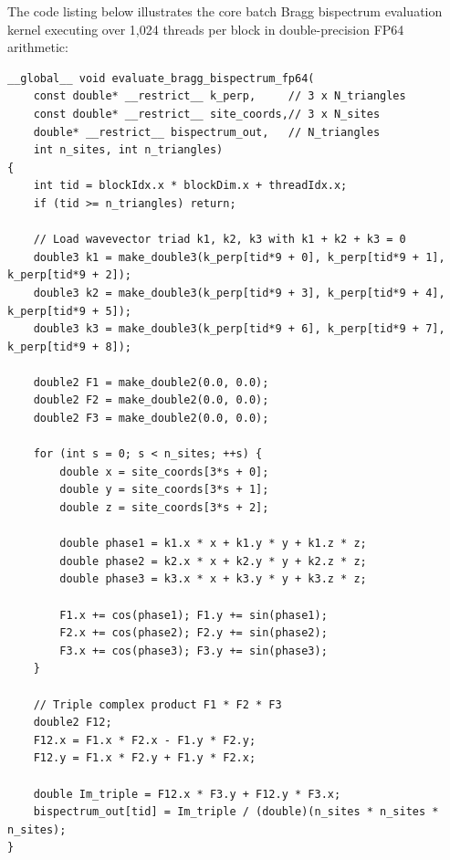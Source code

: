 \documentclass[11pt,a4paper]{article}
\theoremstyle{definition}
\begin{document}
The code listing below illustrates the core batch Bragg bispectrum evaluation kernel executing over 1,024 threads per block in double-precision FP64 arithmetic:

\begin{verbatim}
__global__ void evaluate_bragg_bispectrum_fp64(
    const double* __restrict__ k_perp,     // 3 x N_triangles
    const double* __restrict__ site_coords,// 3 x N_sites
    double* __restrict__ bispectrum_out,   // N_triangles
    int n_sites, int n_triangles) 
{
    int tid = blockIdx.x * blockDim.x + threadIdx.x;
    if (tid >= n_triangles) return;

    // Load wavevector triad k1, k2, k3 with k1 + k2 + k3 = 0
    double3 k1 = make_double3(k_perp[tid*9 + 0], k_perp[tid*9 + 1], k_perp[tid*9 + 2]);
    double3 k2 = make_double3(k_perp[tid*9 + 3], k_perp[tid*9 + 4], k_perp[tid*9 + 5]);
    double3 k3 = make_double3(k_perp[tid*9 + 6], k_perp[tid*9 + 7], k_perp[tid*9 + 8]);

    double2 F1 = make_double2(0.0, 0.0);
    double2 F2 = make_double2(0.0, 0.0);
    double2 F3 = make_double2(0.0, 0.0);

    for (int s = 0; s < n_sites; ++s) {
        double x = site_coords[3*s + 0];
        double y = site_coords[3*s + 1];
        double z = site_coords[3*s + 2];

        double phase1 = k1.x * x + k1.y * y + k1.z * z;
        double phase2 = k2.x * x + k2.y * y + k2.z * z;
        double phase3 = k3.x * x + k3.y * y + k3.z * z;

        F1.x += cos(phase1); F1.y += sin(phase1);
        F2.x += cos(phase2); F2.y += sin(phase2);
        F3.x += cos(phase3); F3.y += sin(phase3);
    }

    // Triple complex product F1 * F2 * F3
    double2 F12;
    F12.x = F1.x * F2.x - F1.y * F2.y;
    F12.y = F1.x * F2.y + F1.y * F2.x;

    double Im_triple = F12.x * F3.y + F12.y * F3.x;
    bispectrum_out[tid] = Im_triple / (double)(n_sites * n_sites * n_sites);
}
\end{verbatim}
\end{document}
